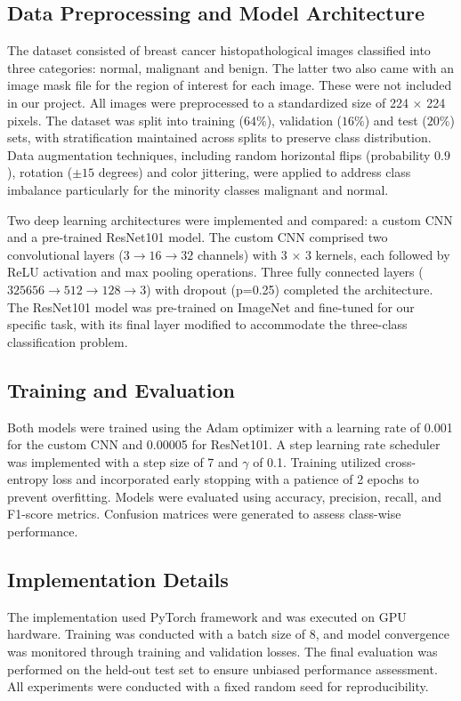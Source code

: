 \subsection{Data Preprocessing and Model Architecture}
The dataset consisted of breast cancer histopathological images classified into three categories: normal, malignant and benign. The latter two also came with an image mask file for the region of interest for each image. These were not included in our project. All images were preprocessed to a standardized size of 224 \( \times \) 224 pixels. The dataset was split into training ($64\%$), validation ($16\%$) and test ($20\%$) sets, with stratification maintained across splits to preserve class distribution. Data augmentation techniques, including random horizontal flips (probability $0.9$), rotation ($\pm 15$ degrees) and color jittering, were applied to address class imbalance particularly for the minority classes malignant and normal.

Two deep learning architectures were implemented and compared: a custom CNN and a pre-trained ResNet101 model\cite{ResNet101}. The custom CNN comprised two convolutional layers ($3\rightarrow 16 \rightarrow 32$ channels) with 3 $\times$ 3 kernels, each followed by ReLU activation and max pooling operations. Three fully connected layers ($325656\rightarrow 512 \rightarrow 128 \rightarrow 3$) with dropout (p=0.25) completed the architecture. The ResNet101 model was pre-trained on ImageNet and fine-tuned for our specific task, with its final layer modified to accommodate the three-class classification problem.

\subsection{Training and Evaluation}
Both models were trained using the Adam optimizer with a learning rate of 0.001 for the custom CNN and 0.00005 for ResNet101. A step learning rate scheduler was implemented with a step size of 7 and $\gamma$ of 0.1. Training utilized cross-entropy loss and incorporated early stopping with a patience of 2 epochs to prevent overfitting. Models were evaluated using accuracy, precision, recall, and F1-score metrics. Confusion matrices were generated to assess class-wise performance.

\subsection{Implementation Details}
The implementation used PyTorch framework and was executed on GPU hardware. Training was conducted with a batch size of 8, and model convergence was monitored through training and validation losses. The final evaluation was performed on the held-out test set to ensure unbiased performance assessment. All experiments were conducted with a fixed random seed for reproducibility.